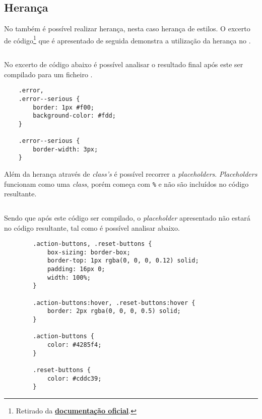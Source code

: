 \subsection{Herança}

No \textbf{} também é possível realizar herança, nesta caso herança de estilos. O excerto de código\footnote{Retirado da \href{https://sass-lang.com/documentation/at-rules/extend}{\textbf{documentação oficial}}.} que é apresentado de seguida demonstra a utilização da herança no \textbf{}.

\begin{longlisting}
	\inputminted{sass}{code/sass/extends.sass}
	\caption{Demonstração de herança no \textbf{Sass}}
\end{longlisting}

No excerto de código abaixo é possível analisar o resultado final após este ser compilado para um ficheiro \textbf{}.

\begin{longlisting}
\begin{verbatim}
	.error,
	.error--serious {
		border: 1px #f00;
		background-color: #fdd;
	}

	.error--serious {
		border-width: 3px;
	}
\end{verbatim}
\caption{Código \textbf{CSS} resultante da compilação do excerto de código anterior}
\end{longlisting}

Além da herança através de \textit{class's} é possível recorrer a \textit{placeholders}. \textit{Placeholders} funcionam como uma \textit{class}, porém começa com \verb|%| e não são incluídos no código \textbf{} resultante.

\begin{longlisting}
	\inputminted{sass}{code/sass/placeholders.sass}
	\caption{Demonstração de \textit{placeholders} em \textbf{Sass}\footnote{Excerto de código retirado da \textbf{\href{https://sass-lang.com/documentation/style-rules/placeholder-selectors}{documentação oficial}}}}
\end{longlisting}

Sendo que após este código ser compilado, o \textit{placeholder} apresentado não estará no código \textbf{} resultante, tal como é possível analisar abaixo.

\begin{longlisting}
	\begin{verbatim}
		.action-buttons, .reset-buttons {
			box-sizing: border-box;
			border-top: 1px rgba(0, 0, 0, 0.12) solid;
			padding: 16px 0;
			width: 100%;
		}

		.action-buttons:hover, .reset-buttons:hover {
			border: 2px rgba(0, 0, 0, 0.5) solid;
		}

		.action-buttons {
			color: #4285f4;
		}

		.reset-buttons {
			color: #cddc39;
		}
	\end{verbatim}
	\caption{Código \textbf{CSS} resultante da compilação do excerto de código com \textit{placeholder}}
\end{longlisting}